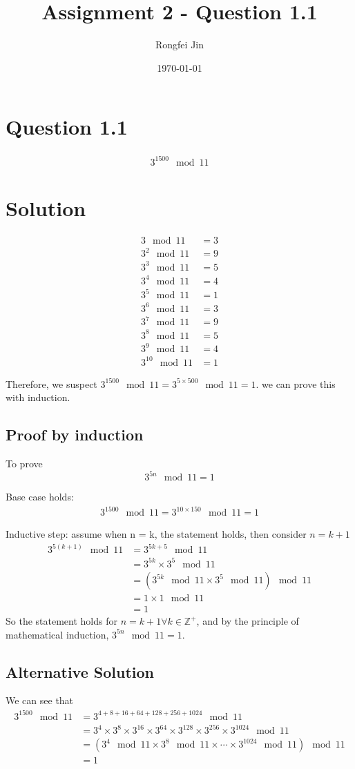 \documentclass{article}
\author{Rongfei Jin}
\title{Assignment 2 - Question 1.1}
\date{\today}
\begin{document}
\section{Question 1.1}
\begin{align*}
3^{1500} \mod 11
\end{align*}
\section{Solution}

\begin{align*}
3 \mod 11 &= 3 \\
3^2 \mod 11 &= 9 \\
3^3 \mod 11 &= 5 \\
3^4 \mod 11 &= 4 \\
3^5 \mod 11 &= 1 \\
3^6 \mod 11 &= 3 \\
3^7 \mod 11 &= 9 \\
3^8 \mod 11 &= 5 \\
3^9 \mod 11 &= 4 \\
3^{10} \mod 11 &= 1
\end{align*}

\noindent
Therefore, we suspect $3^{1500} \mod 11 = 3^{5 \times 500} \mod 11 = 1$.
we can prove this with induction.

\subsection{Proof by induction}
\noindent
To prove $$3^{5n} \mod 11 = 1$$

\noindent
Base case holds:
\begin{align*}
3^{1500} \mod 11 = 3^{10 \times 150} \mod 11 = 1
\end{align*}

\noindent
Inductive step: assume when n = k, the statement holds, then consider $n=k+1$
\begin{align*}
3^{5(k+1)} \mod 11 &= 3^{5k + 5} \mod 11 \\
&= 3^{5k} \times 3^5 \mod 11 \\
&= ( 3^{5k} \mod 11 \times 3^5 \mod 11 ) \mod 11 \\
&= 1 \times 1 \mod 11 \\
&= 1
\end{align*}
So the statement holds for $n = k+1\forall k \in \mathbb{Z^+}$, and by the principle of mathematical induction, $3^{5n} \mod 11 = 1$.

\subsection{Alternative Solution}
We can see that 
\begin{align*}
    3^{1500} \mod 11 &= 3^{4+8+16+64+128+256+1024} \mod 11 \\
    &= 3^4 \times 3^8 \times 3^{16} \times 3^{64} \times 3^{128} \times 3^{256} \times 3^{1024} \mod 11 \\
    &= (3^4 \mod 11 \times 3^8 \mod 11 \times \cdots \times 3^{1024} \mod 11 )\mod 11 \\
    &= 1
\end{align*}
\end{document}
